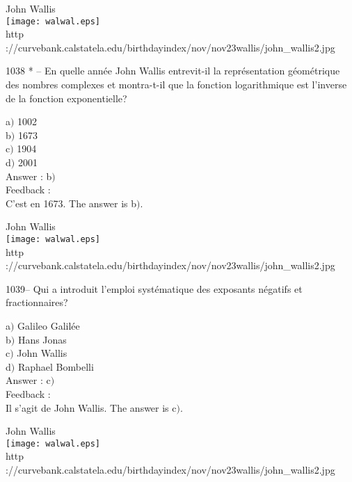 \documentclass[letterpaper, 12pt]{article}
\begin{document}
        \begin{center}
        John Wallis\\
    \texttt{[image: walwal.eps]}\\
        {\footnotesize http
://curvebank.calstatela.edu/birthdayindex/nov/nov23wallis/john\_wallis2.jpg}
    \end{center}

1038 * -- En quelle ann\'ee John Wallis entrevit-il la
repr\'esentation g\'eom\'etrique des nombres complexes et
montra-t-il que la fonction logarithmique est l'inverse de la
fonction exponentielle?

a$)$ 1002 \\
b$)$ 1673  \\
c$)$ 1904  \\
d$)$ 2001 \\

Answer : b$)$\\

Feedback :\\
C'est en 1673.
The answer is b$)$.\\

        \begin{center}
        John Wallis\\
    \texttt{[image: walwal.eps]}\\
        {\footnotesize http
://curvebank.calstatela.edu/birthdayindex/nov/nov23wallis/john\_wallis2.jpg}
    \end{center}

1039-- Qui a introduit l'emploi syst\'ematique des exposants
n\'egatifs et fractionnaires?

a$)$ Galileo Galil\'ee \\
b$)$ Hans Jonas  \\
c$)$ John Wallis  \\
d$)$ Raphael Bombelli \\

Answer : c$)$\\

Feedback :\\
Il s'agit de John Wallis.
The answer is c$)$.\\

        \begin{center}
        John Wallis\\
    \texttt{[image: walwal.eps]}\\
        {\footnotesize http
://curvebank.calstatela.edu/birthdayindex/nov/nov23wallis/john\_wallis2.jpg}
    \end{center}
\end{document}
